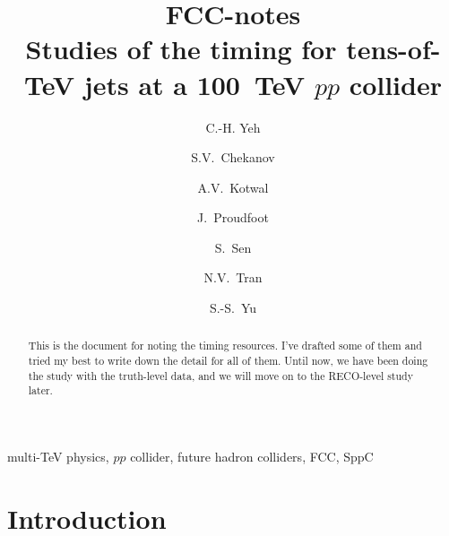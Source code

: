 \documentclass[final,1p,11pt]{elsarticle}
\begin{document}
\begin{frontmatter}

\title{
FCC-notes\\
Studies of the timing for tens-of-TeV jets  at a 100~TeV $pp$ collider 
}

\author[add3]{C.-H. Yeh}

\author[add1]{S.V.~Chekanov}

\author[addDuke]{A.V.~Kotwal}

\author[add1]{J.~Proudfoot}

\author[addDuke]{S.~Sen}

\author[add2]{N.V.~Tran}

\author[add3]{S.-S.~Yu}

\address[add3]{
Department of Physics and Center for High Energy and High Field Physics, 
National Central University, Chung-Li, Taoyuan City 32001, Taiwan
}

\address[add1]{
HEP Division, Argonne National Laboratory,
9700 S.~Cass Avenue,
Argonne, IL 60439, USA. 
}

\address[addDuke]{
Department of Physics, Duke University, USA
}

\address[add2]{
Fermi National Accelerator Laboratory
}




\begin{abstract}
This is the document for noting the timing resources. I've drafted some of them and tried my best to write down the detail for all of them. Until now, we have been doing the study with the truth-level data, and we will move on to the RECO-level study later.

\end{abstract}

\begin{keyword}
multi-TeV physics, $pp$ collider, future hadron colliders, FCC, SppC
\end{keyword}
\end{frontmatter}



\section{Introduction}
\end{document}
